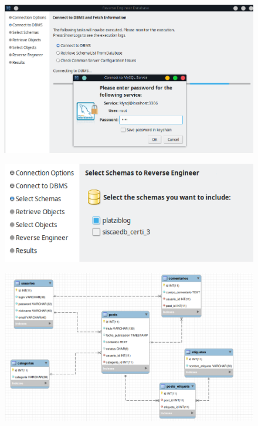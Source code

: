 \documentclass{article}
\begin{document}
\begin{figure}[h!]
  \centering
  \includegraphics[scale=0.55]{./Pictures/077_reverse_engineer.png}
\end{figure}

\begin{figure}[h!]
  \centering
  \includegraphics[scale=0.55]{./Pictures/077_select_schema.png}
\end{figure}

\begin{figure}[h!]
  \centering
  \includegraphics[scale=0.55]{./Pictures/077_diag_fisico_workbench.png}
\end{figure}
\end{document}
